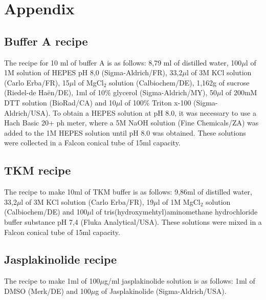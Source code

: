 \documentclass[12pt, a4paper]{article} %
\begin{document}
\pagestyle{empty}



\section{Appendix}

\subsection{Buffer A recipe}

The recipe for 10 ml of buffer A is as follows: 8,79 ml of distilled water, 100$\mu$l of 1M solution of HEPES pH 8,0 (Sigma-Aldrich/FR), 33,2$\mu$l of 3M KCl solution (Carlo Erba/FR), 15$\mu$l of MgCl$_{2}$ solution (Calbiochem/DE), 1,162g of sucrose (Riedel-de Haën/DE), 1ml of 10\% glycerol (Sigma-Aldrich/MY), 50$\mu$l of 200mM DTT solution (BioRad/CA) and 10$\mu$l of 100\% Triton x-100 (Sigma-Aldrich/USA). To obtain a HEPES solution at pH 8.0, it was necessary to use a Hach Basic 20+ ph meter, where a 5M NaOH solution (Fine Chemicals/ZA) was added to the 1M HEPES solution until pH 8.0 was obtained. These solutions were collected in a Falcon conical tube of 15ml capacity. 

\subsection{TKM recipe}

The recipe to make 10ml of TKM buffer is as follows: 9,86ml of distilled water, 33,2$\mu$l of 3M KCl solution (Carlo Erba/FR), 19$\mu$l of 1M MgCl$_{2}$ solution (Calbiochem/DE) and 100$\mu$l of tris(hydroxymehtyl)aminomethane hydrochloride buffer substance pH 7,4 (Fluka Analytical/USA). These solutions were mixed in a Falcon conical tube of 15ml capacity.

\subsection{Jasplakinolide recipe}

The recipe to make 1ml of 100$\mu$g/ml jasplakinolide solution is as follows: 1ml of DMSO (Merk/DE) and 100$\mu$g of Jasplakinolide (Sigma-Aldrich/USA).
\end{document}
